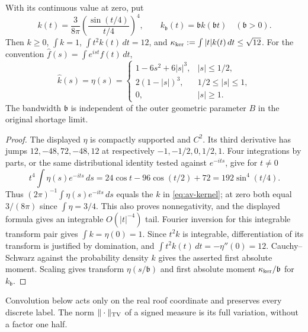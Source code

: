 \begin{lemma}
\label{lem:av-kernel}
With its continuous value at zero, put
\begin{equation}\label{eq:av-kernel}
 k(t)=\frac{3}{8\pi}\left(\frac{\sin(t/4)}{t/4}\right)^4,
 \qquad k_{\mathfrak b}(t)=\mathfrak b k(\mathfrak b t)
 \quad(\mathfrak b>0).
\end{equation}
Then $k\ge0$, $\int k=1$, $\int t^2k(t)\,dt=12$, and
$\kappa_{\rm ker}:=\int|t|k(t)\,dt\le\sqrt{12}$.
For the convention $\widehat f(s)=\int e^{ist}f(t)\,dt$,
\begin{equation}\label{eq:av-kernel-transform}
 \widehat k(s)=\eta(s)=
 \begin{cases}
 1-6s^2+6|s|^3,&|s|\le1/2,\\
 2(1-|s|)^3,&1/2\le|s|\le1,\\
 0,&|s|\ge1.
 \end{cases}
\end{equation}
The bandwidth $\mathfrak b$ is independent of the outer geometric
parameter $B$ in the original shortage limit.
\end{lemma}
\begin{proof}
The displayed $\eta$ is compactly supported and $C^2$.  Its third
derivative has jumps $12,-48,72,-48,12$ at respectively
$-1,-1/2,0,1/2,1$.  Four integrations by parts, or the same
distributional identity tested against $e^{-its}$, give for $t\ne0$
\[
 t^4\int\eta(s)e^{-its}\,ds
 =24\cos t-96\cos(t/2)+72=192\sin^4(t/4).
\]
Thus $(2\pi)^{-1}\int\eta(s)e^{-its}\,ds$ equals the $k$ in
\eqref{eq:av-kernel}; at zero both equal $3/(8\pi)$ since
$\int\eta=3/4$.  This also proves nonnegativity, and the displayed
formula gives an integrable $O(|t|^{-4})$ tail.  Fourier inversion
for this integrable transform pair gives $\int k=\eta(0)=1$.
Since $t^2k$ is integrable, differentiation of its transform is
justified by domination, and
$\int t^2k(t)\,dt=-\eta''(0)=12$.  Cauchy--Schwarz against the
probability density $k$ gives the asserted first absolute moment.
Scaling gives transform $\eta(s/\mathfrak b)$ and first absolute
moment $\kappa_{\rm ker}/\mathfrak b$ for $k_{\mathfrak b}$.
\end{proof}

Convolution below acts only on the real roof coordinate and preserves
every discrete label.  The norm $\|\cdot\|_{\rm TV}$ of a signed
measure is its full variation, without a factor one half.

